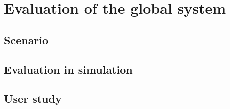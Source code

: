 \documentclass[english,a4paper,11pt,twoside]{StyleThese}
\begin{document}
\setcounter{chapter}{5} %
\dominitoc
\faketableofcontents
\fi

\chapter{Evaluation of the global system}
\minitoc

\section{Scenario}

\section{Evaluation in simulation}

\section{User study}


\ifdefined{}
\else


\end{document}
